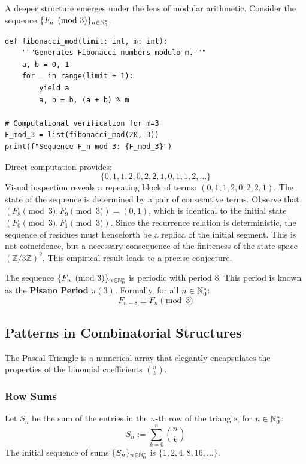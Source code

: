 A deeper structure emerges under the lens of modular arithmetic. Consider the sequence $\{F_n \pmod{3}\}_{n \in \mathbb{N}_{0}^*}$.

\begin{verbatim}
def fibonacci_mod(limit: int, m: int):
    """Generates Fibonacci numbers modulo m."""
    a, b = 0, 1
    for _ in range(limit + 1):
        yield a
        a, b = b, (a + b) % m

# Computational verification for m=3
F_mod_3 = list(fibonacci_mod(20, 3))
print(f"Sequence F_n mod 3: {F_mod_3}")
\end{verbatim}

Direct computation provides:
$$ \{0, 1, 1, 2, 0, 2, 2, 1, 0, 1, 1, 2, \dots\} $$
Visual inspection reveals a repeating block of terms: $(0, 1, 1, 2, 0, 2, 2, 1)$. The state of the sequence is determined by a pair of consecutive terms. Observe that $(F_8 \pmod 3, F_9 \pmod 3) = (0, 1)$, which is identical to the initial state $(F_0 \pmod 3, F_1 \pmod 3)$. Since the recurrence relation is deterministic, the sequence of residues must henceforth be a replica of the initial segment. This is not coincidence, but a necessary consequence of the finiteness of the state space $(\mathbb{Z}/3\mathbb{Z})^2$. This empirical result leads to a precise conjecture.

\begin{proposition}
The sequence $\{F_n \pmod{3}\}_{n \in \mathbb{N}_{0}^*}$ is periodic with period 8. This period is known as the \textbf{Pisano Period} $\pi(3)$. Formally, for all $n \in \mathbb{N}_{0}^*$:
$$F_{n+8} \equiv F_n \pmod{3}$$
\end{proposition}

\subsection{Patterns in Combinatorial Structures}

The Pascal Triangle is a numerical array that elegantly encapsulates the properties of the binomial coefficients $\binom{n}{k}$.

\subsubsection{Row Sums}

Let $S_n$ be the sum of the entries in the $n$-th row of the triangle, for $n \in \mathbb{N}_{0}^*$:
$$ S_n := \sum_{k=0}^{n} \binom{n}{k} $$
The initial sequence of sums $\{S_n\}_{n \in \mathbb{N}_{0}^*}$ is $\{1, 2, 4, 8, 16, \dots\}$.

